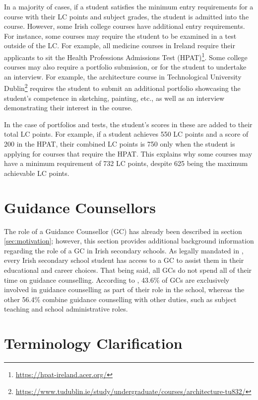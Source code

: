 In a majority of cases, if a student satisfies the minimum entry requirements for a course with their LC points and subject grades,
the student is admitted into the course.
However, some Irish college courses have additional entry requirements.
For instance, some courses may require the student to be examined in a test outside of the LC.
For example, all medicine courses in Ireland require their applicants to sit the Health Professions Admissions Test (HPAT)\footnote{\url{https://hpat-ireland.acer.org/}}.
Some college courses may also require a portfolio submission, or for the student to undertake an interview.
For example, the architecture course in Technological University Dublin\footnote{\url{https://www.tudublin.ie/study/undergraduate/courses/architecture-tu832/}}
requires the student to submit an additional portfolio showcasing the student's competence in sketching, painting, etc., 
as well as an interview demonstrating their interest in the course.

In the case of portfolios and tests, the student's scores in these are added to their total LC points.
For example, if a student achieves 550 LC points and a score of 200 in the HPAT,
their combined LC points is 750 only when the student is applying for courses that require the HPAT.
This explains why some courses may have a minimum requirement of 732 LC points, despite 625 being the maximum achievable LC points.

\section{Guidance Counsellors}
\label{sec:guidance-counsellors}

The role of a Guidance Counsellor (GC) has already been described in section \ref{sec:motivation}; however,
this section provides additional background information regarding the role of a GC in Irish secondary schools.
As legally mandated in \cite{isb1998education}, every Irish secondary school student has access to a GC to assist them in their educational and career choices.
That being said, all GCs do not spend all of their time on guidance counselling.
According to \cite{igc2024survey}, 43.6\% of GCs are exclusively involved in guidance counselling as part of their role in the school,
whereas the other 56.4\% combine guidance counselling with other duties, such as subject teaching and school administrative roles.

\section{Terminology Clarification}

